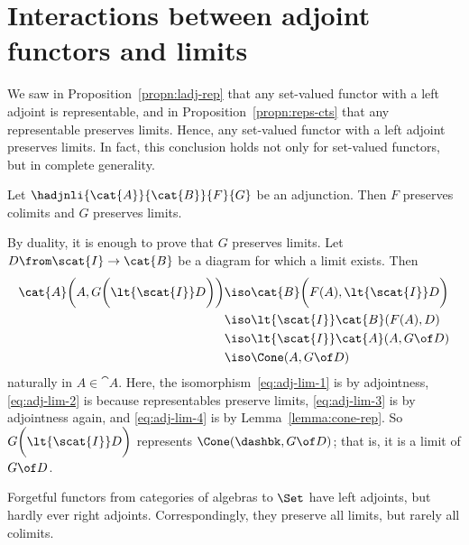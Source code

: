 \section{Interactions between adjoint functors and limits}
\label{sec:adj-lim}


We saw in Proposition~\ref{propn:ladj-rep} that any set-valued functor with
a left adjoint is representable, and in Proposition~\ref{propn:reps-cts}
that any representable preserves limits.  Hence, any set-valued functor
with a left adjoint preserves limits.  In fact, this conclusion holds not
only for set-valued functors, but in complete generality.

\begin{thm}     
\label{thm:adjts-cts}
%
%
%
Let $\hadjnli{\cat{A}}{\cat{B}}{F}{G}$ be an adjunction.  Then $F$ preserves
colimits and $G$ preserves limits.
\end{thm}

\begin{pf}
By duality, it is enough to prove that $G$ preserves limits.  Let $D\from
\scat{I} \to \cat{B}$ be a diagram for which a limit exists.  Then
% 
\begin{align}
\cat{A} \biggl(A, G\biggl(\lt{\scat{I}} D \biggr)\biggr) &
\iso   
\cat{B}\biggl(F(A), \lt{\scat{I}} D\biggr)        
\label{eq:adj-lim-1}    \\
        &
\iso   
\lt{\scat{I}} \cat{B}(F(A), D)        
\label{eq:adj-lim-2}    \\
        &
\iso   
\lt{\scat{I}} \cat{A}(A, G \of D)      
\label{eq:adj-lim-3}    \\
        &
\iso   
\Cone(A, G \of D)
\label{eq:adj-lim-4}
\end{align}
% 
naturally in $A \in \cat{A}$.  Here, the isomorphism~\eqref{eq:adj-lim-1}
is by adjointness, \eqref{eq:adj-lim-2} is because representables preserve
limits, \eqref{eq:adj-lim-3} is by adjointness again, and
\eqref{eq:adj-lim-4} is by Lemma~\ref{lemma:cone-rep}.  So
$G\biggl(\lt{\scat{I}} D\biggr)$ represents $\Cone(\dashbk, G \of D)$; that
is, it is a limit of $G \of D$.
\end{pf}


\begin{example}
Forgetful functors from categories of algebras to $\Set$ have left
adjoints, but hardly ever right adjoints.  Correspondingly, they preserve%
%
%
all limits, but rarely all colimits.
\end{example}

